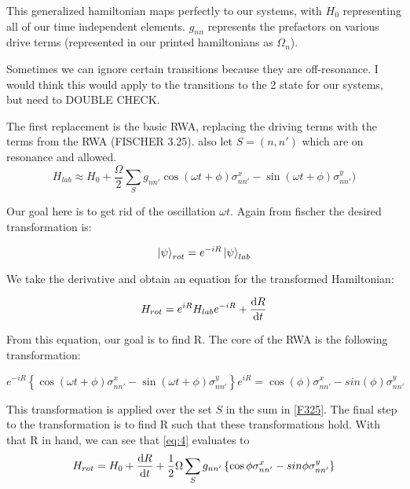 \documentclass[12pt]{article}
\begin{document}
This generalized hamiltonian maps perfectly to our systems, with $H_0$ representing all of our time independent 
elements. $g_{nn}$ 
represents the prefactors on various drive terms (represented in our printed hamiltonians as $\Omega_n$).

Sometimes we can ignore certain transitions because they are off-resonance. I would think this 
would apply to the transitions to the 2 state for our systems, but need to DOUBLE CHECK.

The first replacement is the basic RWA, replacing the driving terms with the terms from the RWA (FISCHER 3.25).
also let $S = {(n,n')}$ which are on resonance and allowed.
\begin{equation}\label{F325}
        H_{lab} \approx H_0 + \frac{\Omega}{2} \sum_S g_{nn'} \cos(\omega t + \phi)\sigma^x_{nn'} - \sin(\omega t + \phi)\sigma^y_{nn'})
\end{equation}

Our goal here is to get rid of the oscillation $\omega t$. Again from fischer the desired transformation is:

\begin{equation}
        \ket{\psi}_{rot} = e^{-iR} \ket{\psi}_{lab}
\end{equation}

We take the derivative and obtain an equation for the transformed Hamiltonian:

\begin{equation}\label{eq:4}
        H_{rot} = e^{iR} H_{lab} e^{-iR} + \derivative{R}{t}
\end{equation}

From this equation, our goal is to find R. The core of the RWA is the following transformation:

\begin{equation}\label{eq:5}
        e^{-iR} \left \{\cos(\omega t + \phi)\sigma^x_{nn'} - \sin(\omega t + \phi)\sigma^y_{nn'}\right \}
        e^{iR} = \cos (\phi) \sigma^x_{nn'} - sin(\phi)\sigma^y_{nn'}
\end{equation}

This transformation is applied over the set $S$ in the sum in \eqref{F325}. The final step to the transformation is to find R 
such that these transformations hold. With that R in hand, we can see that \eqref{eq:4} evaluates to 
\begin{equation}\label{eq:gen_trans}
        H_{rot} = H_0 + \derivative{R}{t} + \frac{1}{2}\Omega \sum_S g_{nn'} \left \{ \cos{\phi} \sigma^x_{nn'} - sin{\phi} \sigma^y_{nn'} \right \}
\end{equation}
\end{document}
